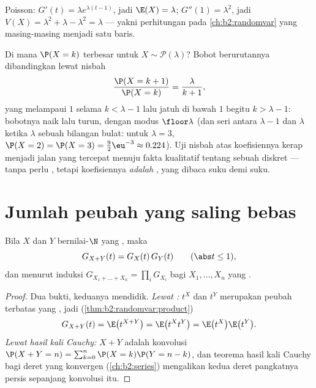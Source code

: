\begin{example}
Poisson: $G'(t) = \lambda e^{\lambda(t-1)}$, jadi $\E(X) = \lambda$;
$G''(1) = \lambda^2$, jadi $V(X) = \lambda^2 + \lambda - \lambda^2 =
\lambda$ --- yakni perhitungan pada \cref{ch:b2:randomvar} yang
masing-masing menjadi satu baris.
\end{example}

\begin{example}
\label{ex:b2:genfun:poissonmode}
Di mana $\P(X = k)$ terbesar untuk $X \sim \mathcal
P(\lambda)$? Bobot berurutannya dibandingkan lewat nisbah
\[
\frac{\P(X = k+1)}{\P(X = k)} = \frac{\lambda}{k + 1} ,
\]
yang melampaui $1$ selama $k < \lambda - 1$ lalu jatuh di bawah
$1$ begitu $k > \lambda - 1$: bobotnya naik lalu turun, dengan
modus $\floor\lambda$ (dan seri antara $\lambda - 1$ dan
$\lambda$ ketika $\lambda$ sebuah bilangan bulat: untuk $\lambda = 3$,
$\P(X = 2) = \P(X = 3) = \frac92\eu^{-3} \approx 0.224$).
Uji nisbah atas koefisiennya kerap menjadi jalan yang tercepat
menuju fakta kualitatif tentang sebuah  diskret --- tanpa perlu , tetapi koefisiennya \emph{adalah} , yang dibaca suku demi suku.
\end{example}

\section{Jumlah peubah yang saling bebas}

\begin{theorem}[Kemultiplikatifan]\label{thm:b2:genfun:product}
Bila $X$ dan $Y$  bernilai-$\N$ yang , maka
\[
G_{X + Y}(t) = G_X(t)\,G_Y(t)
\qquad (\abs t \leq 1),
\]
dan menurut induksi $G_{X_1 + \dots + X_n} = \prod_i G_{X_i}$ bagi
$X_1, \dots, X_n$ yang .
\end{theorem}

\begin{proof}
Dua bukti, keduanya mendidik. \emph{Lewat :} $t^X$ dan
$t^Y$ merupakan peubah terbatas yang , jadi
(\cref{thm:b2:randomvar:product})
\[
G_{X+Y}(t) = \E\bigl(t^{X+Y}\bigr)
= \E\bigl(t^X t^Y\bigr)
= \E\bigl(t^X\bigr)\E\bigl(t^Y\bigr) .
\]
\emph{Lewat hasil kali Cauchy:}  $X + Y$ adalah konvolusi
$\P(X + Y = n) = \sum_{k=0}^n \P(X = k)\P(Y = n - k)$, dan
teorema hasil kali Cauchy bagi deret yang konvergen 
(\cref{ch:b2:series}) mengalikan kedua deret pangkatnya persis
sepanjang konvolusi itu.
\end{proof}

